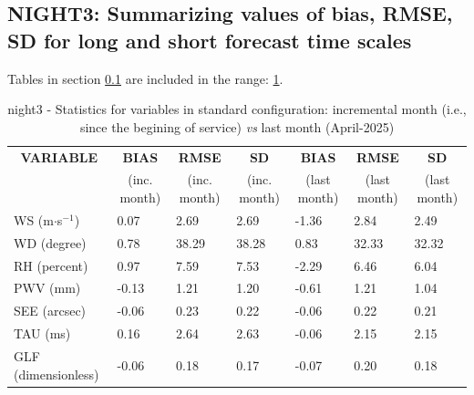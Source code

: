 \subsection{NIGHT3: Summarizing values of bias, RMSE, SD for long and short forecast time scales}\label{subsec:night3:stat}
Tables in section \ref{subsec:night3:stat} are included in the range: \ref{tab:night3:statBEF}.
\begin{table}[h!]
\begin{center}
\begin{tabular}{|l|l|l|l|l|l|l|}
\hline
\multicolumn{1}{|c|}{\cellcolor[HTML]{C0C0C0}\textbf{VARIABLE}} & \multicolumn{1}{c|}{\cellcolor[HTML]{C0C0C0}\textbf{BIAS}} & \multicolumn{1}{c|}{\cellcolor[HTML]{C0C0C0}\textbf{RMSE}} & \multicolumn{1}{c|}{\cellcolor[HTML]{C0C0C0}\textbf{SD}} & \multicolumn{1}{c|}{\cellcolor[HTML]{C0C0C0}\textbf{BIAS}} & \multicolumn{1}{c|}{\cellcolor[HTML]{C0C0C0}\textbf{RMSE}} & \multicolumn{1}{c|}{\cellcolor[HTML]{C0C0C0}\textbf{SD}}\\
\multicolumn{1}{|c|}{\cellcolor[HTML]{C0C0C0}} & \multicolumn{1}{c|}{\cellcolor[HTML]{C0C0C0}(inc. month)} & \multicolumn{1}{c|}{\cellcolor[HTML]{C0C0C0}(inc. month)} & \multicolumn{1}{c|}{\cellcolor[HTML]{C0C0C0}(inc. month)} & \multicolumn{1}{c|}{\cellcolor[HTML]{C0C0C0}(last month)} & \multicolumn{1}{c|}{\cellcolor[HTML]{C0C0C0}(last month)} & \multicolumn{1}{c|}{\cellcolor[HTML]{C0C0C0}(last month)}\\\hline
\cellcolor[HTML]{C0C0C0}WS (m$\cdot$s$^{-1}$) &      0.07  &      2.69  &      2.69  &     -1.36     &      2.84     &      2.49\\
\cellcolor[HTML]{C0C0C0}WD (degree)           &      0.78  &     38.29  &     38.28  &      0.83     &     32.33     &     32.32\\
\cellcolor[HTML]{C0C0C0}RH (percent)          &      0.97  &      7.59  &      7.53  &     -2.29     &      6.46     &      6.04\\
\cellcolor[HTML]{C0C0C0}PWV (mm)              &     -0.13 &      1.21 &      1.20 &     -0.61    &      1.21    &      1.04\\
\cellcolor[HTML]{C0C0C0}SEE (arcsec)          &     -0.06 &      0.23 &      0.22 &     -0.06    &      0.22    &      0.21\\
\cellcolor[HTML]{C0C0C0}TAU (ms)              &      0.16 &      2.64 &      2.63 &     -0.06    &      2.15    &      2.15\\
\cellcolor[HTML]{C0C0C0}GLF (dimensionless)   &     -0.06 &      0.18 &      0.17 &     -0.07    &      0.20    &      0.18\\
\hline
\end{tabular}
\caption{night3 - Statistics for variables in standard configuration: incremental month (i.e., since the begining of service) \textit{vs} last month (April-2025)}\label{tab:night3:statBEF}
\end{center}
\end{table}

